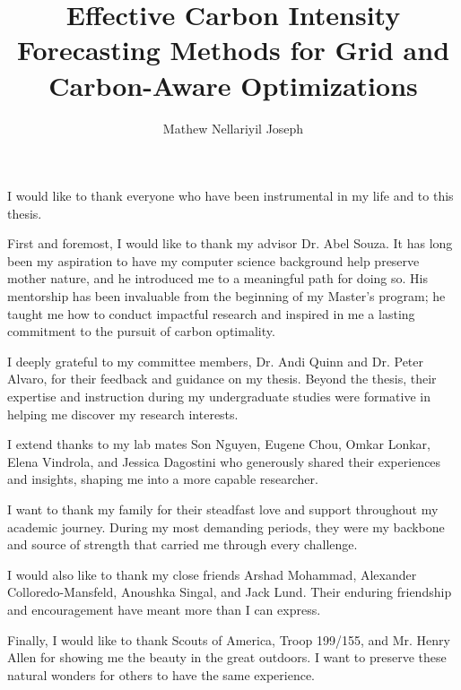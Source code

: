 \documentclass[11pt]{ucthesis}
\begin{document}
\title{Effective Carbon Intensity Forecasting Methods for Grid and Carbon-Aware Optimizations}
\author{Mathew Nellariyil Joseph}
\deanlinethree{}

\begin{frontmatter}
\maketitle
\copyrightpage
\tableofcontents
\listoffigures
\listoftables

\begin{abstract}

\end{abstract}

\begin{acknowledgements}
  I would like to thank everyone who have been instrumental in my life and to this thesis.
  
  First and foremost, I would like to thank my advisor Dr. Abel Souza.
  It has long been my aspiration to have my computer science background help preserve mother nature, and he introduced me to a meaningful path for doing so.        
  His mentorship has been invaluable from the beginning of my Master's program; he taught me how to conduct impactful research and inspired in me a lasting commitment to the pursuit of carbon optimality.  
  
  I deeply grateful to my committee members, Dr. Andi Quinn and Dr. Peter Alvaro, for their feedback and guidance on my thesis. 
  Beyond the thesis, their expertise and instruction during my undergraduate studies were formative in helping me discover my research interests.
  
  I extend thanks to my lab mates Son Nguyen, Eugene Chou, Omkar Lonkar, Elena Vindrola, and Jessica Dagostini who generously shared their experiences and insights, shaping me into a more capable researcher. 
  
  I want to thank my family for their steadfast love and support throughout my academic journey. 
  During my most demanding periods, they were my backbone and source of strength that carried me through every challenge. 
  
  I would also like to thank my close friends Arshad Mohammad, Alexander Colloredo-Mansfeld, Anoushka Singal, and Jack Lund. 
  Their enduring friendship and encouragement have meant more than I can express.
  
  Finally, I would like to thank Scouts of America, Troop 199/155, and Mr. Henry Allen for showing me the beauty in the great outdoors. I want to preserve these natural wonders for others to have the same experience. 
\end{acknowledgements}
\end{frontmatter}
\end{document}
